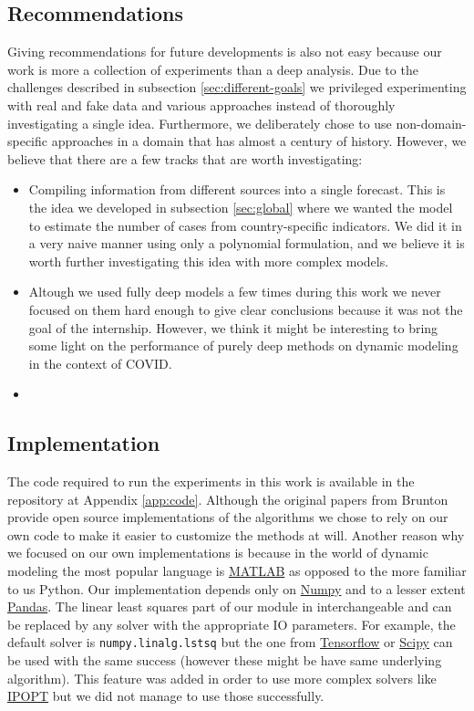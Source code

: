 \documentclass[12pt, letterpaper]{article}
\begin{document}
\subsection{Recommendations}

Giving recommendations for future developments is also not easy because our work is more a collection of experiments than a deep analysis. 
Due to the challenges described in subsection \ref{sec:different-goals} we privileged experimenting with real and fake data and various approaches instead of thoroughly investigating a single idea. 
Furthermore, we deliberately chose to use non-domain-specific approaches in a domain that has almost a century of history.
However, we believe that there are a few tracks that are worth investigating:

\begin{itemize}
	\item Compiling information from different sources into a single forecast. This is the idea we developed in subsection \ref{sec:global} where we wanted the model to estimate the number of cases from country-specific indicators. 
	We did it in a very naive manner using only a polynomial formulation, and we believe it is worth further investigating this idea with more complex models. 
	\item Altough we used fully deep models a few times during this work we never focused on them hard enough to give clear conclusions because it was not the goal of the internship. However, we think it might be interesting to bring some light on the performance of purely deep methods on dynamic modeling in the context of COVID.
	\item 

\end{itemize}

\subsection{Implementation}

The code required to run the experiments in this work is available in the repository at Appendix \ref{app:code}. Although the original papers from Brunton \cite{sindy, sindy2} provide open source implementations of the algorithms we chose to rely on our own code to make it easier to customize the methods at will. 
Another reason why we focused on our own implementations is because in the world of dynamic modeling the most popular language is \href{https://www.mathworks.com/products/matlab.html}{MATLAB} as opposed to the more familiar to us Python.
Our implementation depends only on \href{https://numpy.org/doc/stable/index.html}{Numpy} and to a lesser extent \href{https://pandas.pydata.org/}{Pandas}.
The linear least squares part of our module in interchangeable and can be replaced by any solver with the appropriate IO parameters. 
For example, the default solver is \texttt{numpy.linalg.lstsq} but the one from \href{https://www.tensorflow.org/}{Tensorflow} or \href{https://www.scipy.org/}{Scipy} can be used with the same success (however these might be have same underlying algorithm).
This feature was added in order to use more complex solvers like \href{https://github.com/coin-or/Ipopt}{IPOPT} but we did not manage to use those successfully.
\end{document}
